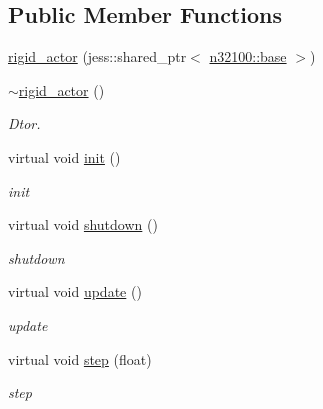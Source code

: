 \subsection*{Public Member Functions}
\begin{DoxyCompactItemize}
\item 
\hyperlink{classnebula_1_1content_1_1actor_1_1admin_1_1rigid__actor_a3c5294dcb0d95c48a2e7beb085c9033f}{rigid\_\-actor} (jess::shared\_\-ptr$<$ \hyperlink{classnebula_1_1content_1_1scene_1_1admin_1_1base}{n32100::base} $>$)
\item 
\hyperlink{classnebula_1_1content_1_1actor_1_1admin_1_1rigid__actor_a017c413b639fea45c3910321289613d8}{$\sim$rigid\_\-actor} ()
\begin{DoxyCompactList}\small\item\em Dtor. \item\end{DoxyCompactList}\item 
virtual void \hyperlink{classnebula_1_1content_1_1actor_1_1admin_1_1rigid__actor_a4de1558a31bb13bcf92279a4d823ddbb}{init} ()
\begin{DoxyCompactList}\small\item\em init \item\end{DoxyCompactList}\item 
virtual void \hyperlink{classnebula_1_1content_1_1actor_1_1admin_1_1rigid__actor_afe9a6592087cac6054f6416d7c617eaa}{shutdown} ()
\begin{DoxyCompactList}\small\item\em shutdown \item\end{DoxyCompactList}\item 
virtual void \hyperlink{classnebula_1_1content_1_1actor_1_1admin_1_1rigid__actor_a3c0adb150e7bfb43c209e6dc102253a5}{update} ()
\begin{DoxyCompactList}\small\item\em update \item\end{DoxyCompactList}\item 
virtual void \hyperlink{classnebula_1_1content_1_1actor_1_1admin_1_1rigid__actor_aba5200b2e542e3f0433c89ef026c5673}{step} (float)
\begin{DoxyCompactList}\small\item\em step \item\end{DoxyCompactList}\item 

\end{DoxyCompactItemize}

